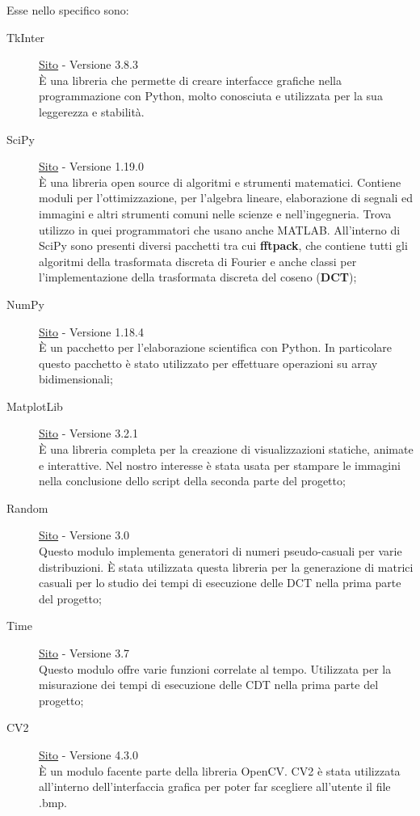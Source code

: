 \documentclass[preprint,12pt]{elsarticle}
\begin{document}
	Esse nello specifico sono:
	\begin{description}
		\item[TkInter] \href{https://docs.python.org/3/library/tk.html}{Sito} - Versione 3.8.3 \\
		\`E una libreria che permette di creare interfacce grafiche nella programmazione con Python, molto conosciuta e utilizzata per la sua leggerezza e stabilità.
		
		\item[SciPy] \href{https://www.scipy.org}{Sito} - Versione 1.19.0 \\
		\`E una libreria open source di algoritmi e strumenti matematici. Contiene moduli per l'ottimizzazione, per l'algebra lineare, elaborazione di segnali ed immagini  e altri strumenti comuni nelle scienze e nell'ingegneria. Trova utilizzo in quei programmatori che usano anche MATLAB. All'interno di SciPy sono presenti diversi pacchetti tra cui \textbf{fftpack}, che contiene tutti gli algoritmi della trasformata discreta di Fourier e anche classi per l'implementazione della trasformata discreta del coseno (\textbf{DCT});
		
		\item[NumPy] \href{https://numpy.org}{Sito} - Versione 1.18.4 \\
		\`E un pacchetto per l'elaborazione scientifica con Python. In particolare questo pacchetto è stato utilizzato per effettuare operazioni su array bidimensionali;
		
		\item[MatplotLib] \href{https://matplotlib.org}{Sito} - Versione 3.2.1 \\
		\`E una libreria completa per la creazione di visualizzazioni statiche, animate e interattive. Nel nostro interesse è stata usata per stampare le immagini nella conclusione dello script della seconda parte del progetto;
		
		\item[Random] \href{https://docs.python.org/3.8/library/random.html}{Sito} - Versione 3.0 \\
		Questo modulo implementa generatori di numeri pseudo-casuali per varie distribuzioni. \`E stata utilizzata questa libreria per la generazione di matrici casuali per lo studio dei tempi di esecuzione delle DCT nella prima parte del progetto;
		
		\item[Time] \href{https://docs.python.org/3/library/time.html}{Sito} - Versione 3.7 \\
		Questo modulo offre varie funzioni correlate al tempo. Utilizzata per la misurazione dei tempi di esecuzione delle CDT nella prima parte del progetto;
		
		\item[CV2] \href{https://docs.opencv.org/master/index.html}{Sito} - Versione 4.3.0 \\
		\`E un modulo facente parte della libreria OpenCV. CV2 è stata utilizzata all'interno dell'interfaccia grafica per poter far scegliere all'utente il file .bmp.
	\end{description}
	
\end{document}
